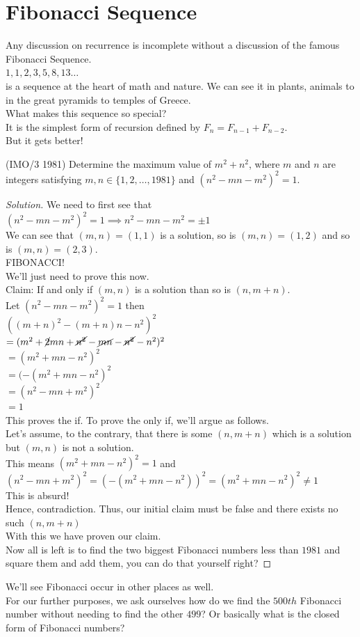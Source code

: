 \section{Fibonacci Sequence}
Any discussion on recurrence is incomplete without a discussion of the famous Fibonacci Sequence.\\
$1,1,2,3,5,8,13 \dots$ \\ is a sequence at the heart of math and nature. We can see it in plants, animals to in the great pyramids to temples of Greece.\\
What makes this sequence so special?\\
It is the simplest form of recursion defined by $F_n=F_{n-1}+F_{n-2}$.\\
But it gets better!\\
\begin{example}
(IMO/3 1981) Determine the maximum value of $\displaystyle m^2 + n^2$, where $\displaystyle m$ and $\displaystyle n$ are integers satisfying $m, n \in \{ 1,2, \ldots , 1981 \}$ and $\displaystyle ( n^2 - mn - m^2 )^2 = 1$.
\end{example}
\begin{proof}
    [Solution]
We need to first see that $(n^2-mn-m^2)^2=1 \implies n^2-mn-m^2=\pm1$\\ 
We can see that  $(m,n)=(1,1)$ is a solution, so is $(m,n)=(1,2)$ and so is $(m,n)=(2,3)$.\\
FIBONACCI!\\
We'll just need to prove this now.\\
Claim: If and only if $(m,n)$ is a solution than so is $(n,m+n)$.\\
Let $(n^2-mn-m^2)^2=1$ then\\
$((m+n)^2-(m+n)n-n^2)^2$\\
$=(m^2+\cancel{2}mn+\cancel{n^2}-\cancel{mn}-\cancel{n^2}-n^2)^2$\\
$=(m^2+mn-n^2)^2$\\
$= (-(m^2+mn-n^2)^2$\\
$= (n^2-mn+m^2)^2$\\
$=1$\\
This proves the if. To prove the only if, we'll argue as follows.\\
Let's assume, to the contrary, that there is some $(n,m+n)$ which is a solution but $(m,n)$ is not a solution.\\
This means $(m^2+mn-n^2)^2=1$  and $(n^2-mn+m^2)^2 = (-(m^2+mn-n^2))^2 = (m^2+mn-n^2)^2 \neq 1$\\
This is absurd!\\
Hence, contradiction. Thus, our initial claim must be false and there exists no such $(n,m+n)$\\
With this we have proven our claim.\\
Now all is left is to find the two biggest Fibonacci numbers less than $1981$ and square them and add them, you can do that yourself right?
\end{proof}
We'll see Fibonacci occur in other places as well.\\
For our further purposes, we ask ourselves how do we find the $500th$ Fibonacci number without needing to find the other $499$? Or basically what is the closed form of Fibonacci numbers?
